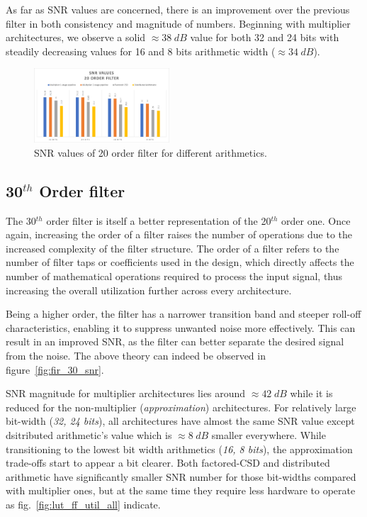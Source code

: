 As far as SNR values are concerned, there is an improvement over the previous filter in both consistency and magnitude of numbers. Beginning with multiplier architectures, we observe a solid $\approx 38 \hspace{3pt} dB$ value for both 32 and 24 bits with steadily decreasing values for 16 and 8 bits arithmetic width ($\approx 34 \hspace{3pt} dB$).

\begin{figure}
	\centering
	\includegraphics[width=0.45\textwidth]{../Images/FIR_20_Order/snr_values.png}
	\caption{SNR values of 20 order filter for different arithmetics.}
	\label{fig:fir_20_snr}
\end{figure}

\subsection{30$^{th}$ Order filter}
The 30$^{th}$ order filter is itself a better representation of the 20$^{th}$ order one.
Once again, increasing the order of a filter raises the number of operations due to the increased complexity of the filter structure.
The order of a filter refers to the number of filter taps or coefficients used in the design, which directly affects the number of mathematical operations required to process the input signal, thus increasing the overall utilization further across every architecture.

Being a higher order, the filter has a narrower transition band and steeper roll-off characteristics, enabling it to suppress unwanted noise more effectively. This can result in an improved SNR, as the filter can better separate the desired signal from the noise. The above theory can indeed be observed in figure~\ref{fig:fir_30_snr}.

SNR magnitude for multiplier architectures lies around $\approx 42 \hspace{3pt} dB$ while it is reduced for the non-multiplier (\emph{approximation}) architectures. For relatively large bit-width (\emph{32, 24 bits}), all architectures have almost the same SNR value except dsitributed arithmetic's value which is $\approx8 \hspace{3pt} dB$ smaller everywhere. While transitioning to the lowest bit width arithmetics (\emph{16, 8 bits}), the approximation trade-offs start to appear a bit clearer.
Both factored-CSD and distributed arithmetic have significantly smaller SNR number for those bit-widths compared with multiplier ones, but at the same time they require less hardware to operate as fig.~\ref{fig:lut_ff_util_all} indicate.


